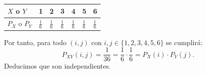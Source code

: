 \documentclass[]{book}
\begin{document}
\begin{longtable}[]{@{}lllllll@{}}
\toprule
\begin{minipage}[b]{0.12\columnwidth}\raggedright
\(X\) o \(Y\)\strut
\end{minipage} & \begin{minipage}[b]{0.12\columnwidth}\raggedright
1\strut
\end{minipage} & \begin{minipage}[b]{0.12\columnwidth}\raggedright
2\strut
\end{minipage} & \begin{minipage}[b]{0.12\columnwidth}\raggedright
3\strut
\end{minipage} & \begin{minipage}[b]{0.12\columnwidth}\raggedright
4\strut
\end{minipage} & \begin{minipage}[b]{0.12\columnwidth}\raggedright
5\strut
\end{minipage} & \begin{minipage}[b]{0.12\columnwidth}\raggedright
6\strut
\end{minipage}\tabularnewline
\midrule
\endhead
\begin{minipage}[t]{0.12\columnwidth}\raggedright
\(P_X\) o \(P_Y\)\strut
\end{minipage} & \begin{minipage}[t]{0.12\columnwidth}\raggedright
\(\frac{1}{6}\)\strut
\end{minipage} & \begin{minipage}[t]{0.12\columnwidth}\raggedright
\(\frac{1}{6}\)\strut
\end{minipage} & \begin{minipage}[t]{0.12\columnwidth}\raggedright
\(\frac{1}{6}\)\strut
\end{minipage} & \begin{minipage}[t]{0.12\columnwidth}\raggedright
\(\frac{1}{6}\)\strut
\end{minipage} & \begin{minipage}[t]{0.12\columnwidth}\raggedright
\(\frac{1}{6}\)\strut
\end{minipage} & \begin{minipage}[t]{0.12\columnwidth}\raggedright
\(\frac{1}{6}\)\strut
\end{minipage}\tabularnewline
\bottomrule
\end{longtable}

Por tanto, para todo \((i,j)\) con \(i,j\in\{1,2,3,4,5,6\}\) se cumplirá:
\[
P_{XY}(i,j)=\frac{1}{36}=\frac{1}{6}\cdot \frac{1}{6}=P_X(i)\cdot P_Y(j).
\]
Deducimos que son independientes.
\end{document}
